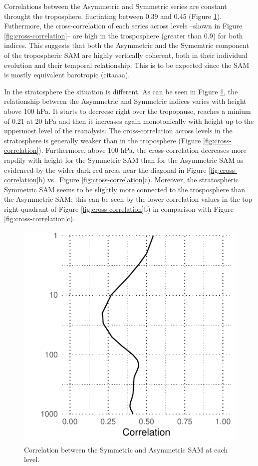 \documentclass[]{ametsocV5}
\begin{document}
Correlations between the Asymmetric and Symmetric series are constant
throught the troposphere, fluctiating between 0.39 and 0.45 (Figure
\ref{fig:cor-lev}). Futhermore, the cross-correlation of each series
across levels --shown in Figure \ref{fig:cross-correlation}-- are high
in the trosposphere (greater than 0.9) for both indices. This suggests
that both the Asymmetric and the Symemtric component of the tropospheric
SAM are highly vertically coherent, both in their individual evolution
and their temporal relationship. This is to be expected since the SAM is
mostly equivalent barotropic (citaaaa).

In the stratosphere the situation is different. As can be seen in Figure
\ref{fig:cor-lev}, the relationship between the Asymmetric and Symmetric
indices varies with height above 100 hPa. It starts to decreese right
over the tropopause, reaches a minium of 0.21 at 20 hPa and then it
increases again monotonically with height up to the uppermost level of
the reanalysis. The cross-correlation across levels in the stratosphere
is generally weaker than in the troposphere (Figure
\ref{fig:cross-correlation}). Furthermore, above 100 hPa, the
cross-correlation decreases more rapdily with height for the Symmetric
SAM than for the Asymmetric SAM as evidenced by the wider dark red areas
near the diagonal in Figure \ref{fig:cross-correlation}b) vs.~Figure
\ref{fig:cross-correlation}c). Moreover, the stratospheric Symmetric SAM
seems to be slightly more connected to the trosposphere than the
Asymmetric SAM; this can be seen by the lower correlation values in the
top right quadrant of Figure \ref{fig:cross-correlation}b) in comparison
with Figure \ref{fig:cross-correlation}c).

\begin{figure}
\includegraphics{cor-lev-1} \caption[Correlation between the Symmetric and Asymmetric SAM at each level]{Correlation between the Symmetric and Asymmetric SAM at each level.}\label{fig:cor-lev}
\end{figure}
\end{document}
